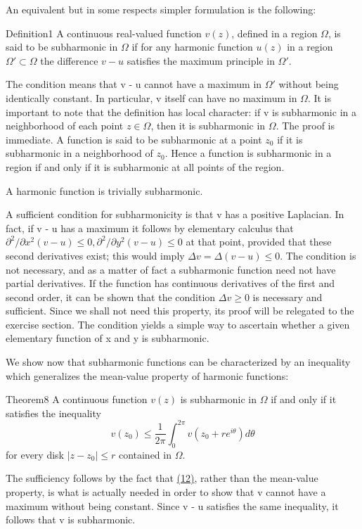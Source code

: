 An equivalent but in some respects simpler formulation is the following:

\begin{originalstatement}{Definition}{1}\label{def:6.1}
A continuous real-valued function $v(z)$, defined in a region $\Omega$, is said to be subharmonic in $\Omega$ if for any harmonic function $u(z)$ in a region $\Omega' \subset \Omega$ the difference $v - u$ satisfies the maximum principle in $\Omega'$.
\end{originalstatement}
The condition means that v - u cannot have a maximum in $\Omega'$ without being identically constant. In particular, v itself can have no maximum in $\Omega$. It is important to note that the definition has local character: if v is subharmonic in a neighborhood of each point $z \in \Omega$, then it is subharmonic in $\Omega$. The proof is immediate. A function is said to be subharmonic at a point $z_{0}$ if it is subharmonic in a neighborhood of $z_{0}$. Hence a function is subharmonic in a region if and only if it is subharmonic at all points of the region.

A harmonic function is trivially subharmonic.

A sufficient condition for subharmonicity is that v has a positive Laplacian. In fact, if v - u has a maximum it follows by elementary
calculus that $\partial^{2}/\partial x^{2}(v-u)\leq0,\partial^{2}/\partial y^{2}(v-u)\leq0$ at that point, provided that these second derivatives exist; this would imply $\Delta v=\Delta(v-u)\leq0$. The condition is not necessary, and as a matter of fact a subharmonic function need not have partial derivatives. If the function has continuous derivatives of the first and second order, it can be shown that the condition $\Delta v\geq0$ is necessary and sufficient. Since we shall not need this property, its proof will be relegated to the exercise section. The condition yields a simple way to ascertain whether a given elementary function of x and y is subharmonic.

We show now that subharmonic functions can be characterized by an inequality which generalizes the mean-value property of harmonic functions:

\begin{originalstatement}{Theorem}{8}\label{thm:6.8}
A continuous function $v(z)$ is subharmonic in $\Omega$ if and only if it satisfies the inequality
\begin{equation*}
v (z _ {0}) \leq \frac {1}{2 \pi} \int_ {0} ^ {2 \pi} v (z _ {0} + r e ^ {i \theta}) d \theta\tag{12}\label{eq:6.12}
\end{equation*}
for every disk $|z - z_0| \leq r$ contained in $\Omega$.

\end{originalstatement}
The sufficiency follows by the fact that \hyperref[eq:6.12]{(12)}, rather than the mean-value property, is what is actually needed in order to show that v cannot have a maximum without being constant. Since v - u satisfies the same inequality, it follows that v is subharmonic.

